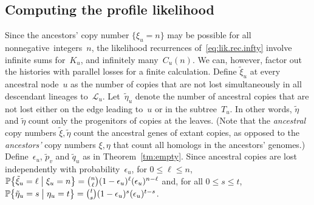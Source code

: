 \documentclass{elsarticle}
\newcommand{\condgen}[6]{{#1}#2 #5 #3 #6 #4}
\newcommand{\PROB}{\mathbb{P}}
\newcommand{\Probcsm}[2]{\condgen{\PROB}{\bigl\{}{\bigm|}{\bigr\}}{#1}{#2}}
\newcommand{\nlik}{C}
\newcommand{\slik}{K}
\newcommand{\nx}{u}
\newcommand{\ny}{v}
\newcommand{\nz}{w}
\begin{document}

\subsection{Computing the profile likelihood}
Since the ancestors' copy number $\{\xi_{\nx}=n\}$ may be possible for all nonnegative~integers~$n$,
the likelihood recurrences of~\eqref{eq:lik.rec.infty}
involve infinite sums for~$\slik_{\nx}$, and 
infinitely many~$\nlik_{\nx}(n)$. 
We can, however, factor out the histories
with parallel losses for a finite calculation.
Define $\tilde{\xi}_{\nx}$ at every ancestral node~${\nx}$  
as the number of copies that are not lost simultaneously in
all descendant lineages to~$\mathcal{L}_{\nx}$.  
Let~$\tilde{\eta}_{\nx}$ denote 
the number of ancestral copies that are not lost either 
on the edge leading to~$\nx$ or in the subtree~$T_{\nx}$. 
In other words, $\tilde{\eta}$ and $\tilde{\eta}$ count 
only the progenitors of copies at the leaves.
(Note that the {\em ancestral} copy numbers $\tilde{\xi},\tilde{\eta}$ count 
the ancestral genes of extant copies, as opposed 
to the {\em ancestors'} copy numbers $\xi,\eta$ that count 
all homologs in the ancestors' genomes.) 
Define~$\epsilon_{\nx}$, $\tilde{p}_{\ny}$ and $\tilde{q}_{\nx}$ as in 
Theorem~\ref{tm:empty}.
Since 
ancestral copies are lost independently with probability~$\epsilon_{\nx}$,  
for $0\le \ell\le n$, 
$\Probcsm{\tilde{\xi}_{\nx}=\ell}{\xi_{\nx}=n}
	= \binom{n}{\ell}
		(1-\epsilon_{\nx})^{\ell} (\epsilon_{\nx})^{n-\ell}$
and, for all $0\le s\le t$,
$\Probcsm{\tilde{\eta}_{\nx}=s}{\eta_{\nx}=t}
	= \binom{t}{s}
		(1-\epsilon_{\nx})^{s} (\epsilon_{\nx})^{t-s}
$.
\end{document}
